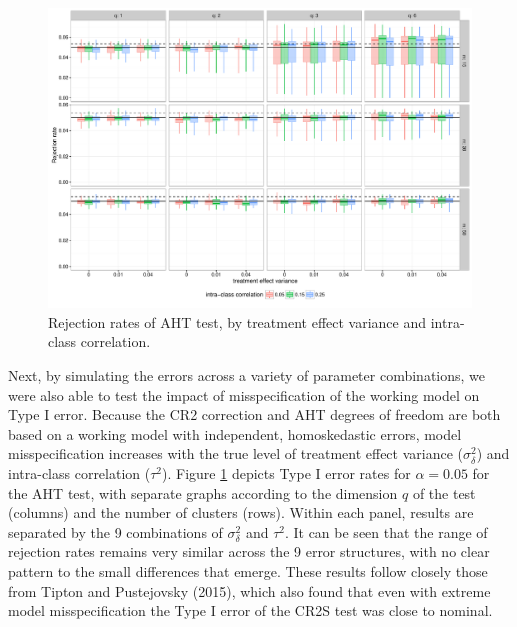 \documentclass[12pt]{article}\usepackage[]{graphicx}\usepackage[]{color}
\newenvironment{knitrout}{}{} %
\begin{document}
\begin{knitrout}
\color{fgcolor}\begin{figure}

{\centering \includegraphics[width=\linewidth]{CR_fig/misspecification-1} 

}

\caption[Rejection rates of AHT test, by treatment effect variance and intra-class correlation]{Rejection rates of AHT test, by treatment effect variance and intra-class correlation.}\label{fig:misspecification}
\end{figure}


\end{knitrout}

Next, by simulating the errors across a variety of parameter combinations, we were also able to test the impact of misspecification of the working model on Type I error.
Because the CR2 correction and AHT degrees of freedom are both based on a working model with independent, homoskedastic errors, model misspecification increases with the true level of treatment effect variance ($\sigma_\delta^2$) and intra-class correlation ($\tau^2$).
Figure \ref{fig:misspecification} depicts Type I error rates for $\alpha = 0.05$ for the AHT test, with separate graphs according to the dimension $q$ of the test (columns) and the number of clusters (rows).
Within each panel, results are separated by the 9 combinations of $\sigma_\delta^2$ and $\tau^2$. 
It can be seen that the range of rejection rates remains very similar across the 9 error structures, with no clear pattern to the small differences that emerge.
These results follow closely those from Tipton and Pustejovsky (2015), which also found that even with extreme model misspecification the Type I error of the CR2S test was close to nominal. 
\end{document}

